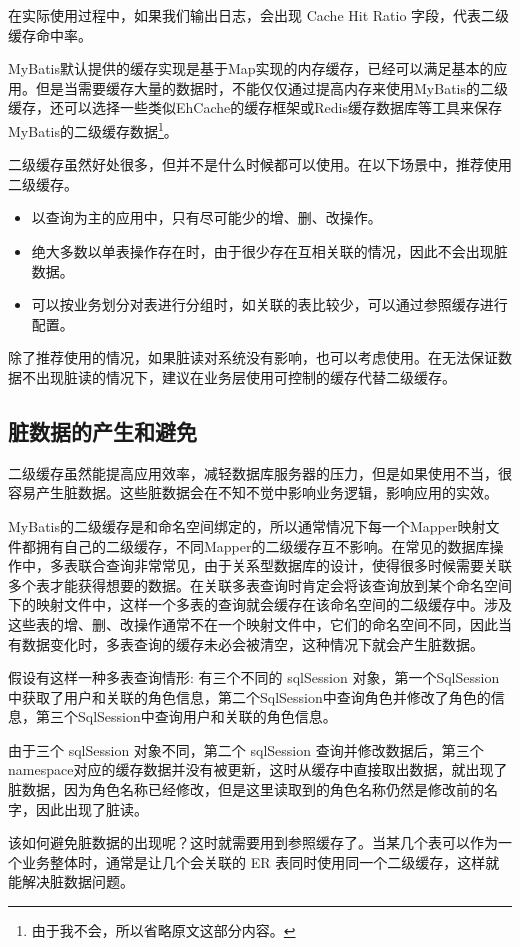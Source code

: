 在实际使用过程中，如果我们输出日志，会出现 Cache Hit Ratio 字段，代表二级缓存命中率。

MyBatis默认提供的缓存实现是基于Map实现的内存缓存，已经可以满足基本的应用。但是当需要缓存大量的数据时，不能仅仅通过提高内存来使用MyBatis的二级缓存，还可以选择一些类似EhCache的缓存框架或Redis缓存数据库等工具来保存MyBatis的二级缓存数据\footnote{由于我不会，所以省略原文这部分内容。}。

二级缓存虽然好处很多，但并不是什么时候都可以使用。在以下场景中，推荐使用二级缓存。

\begin{itemize}
    \item 以查询为主的应用中，只有尽可能少的增、删、改操作。
    \item 绝大多数以单表操作存在时，由于很少存在互相关联的情况，因此不会出现脏数据。
    \item 可以按业务划分对表进行分组时，如关联的表比较少，可以通过参照缓存进行配置。
\end{itemize}

除了推荐使用的情况，如果脏读对系统没有影响，也可以考虑使用。在无法保证数据不出现脏读的情况下，建议在业务层使用可控制的缓存代替二级缓存。

\subsection{脏数据的产生和避免}

二级缓存虽然能提高应用效率，减轻数据库服务器的压力，但是如果使用不当，很容易产生脏数据。这些脏数据会在不知不觉中影响业务逻辑，影响应用的实效。

MyBatis的二级缓存是和命名空间绑定的，所以通常情况下每一个Mapper映射文件都拥有自己的二级缓存，不同Mapper的二级缓存互不影响。在常见的数据库操作中，多表联合查询非常常见，由于关系型数据库的设计，使得很多时候需要关联多个表才能获得想要的数据。在关联多表查询时肯定会将该查询放到某个命名空间下的映射文件中，这样一个多表的查询就会缓存在该命名空间的二级缓存中。涉及这些表的增、删、改操作通常不在一个映射文件中，它们的命名空间不同，因此当有数据变化时，多表查询的缓存未必会被清空，这种情况下就会产生脏数据。

假设有这样一种多表查询情形: 有三个不同的 sqlSession 对象，第一个SqlSession中获取了用户和关联的角色信息，第二个SqlSession中查询角色并修改了角色的信息，第三个SqlSession中查询用户和关联的角色信息。

由于三个 sqlSession 对象不同，第二个 sqlSession 查询并修改数据后，第三个namespace对应的缓存数据并没有被更新，这时从缓存中直接取出数据，就出现了脏数据，因为角色名称已经修改，但是这里读取到的角色名称仍然是修改前的名字，因此出现了脏读。

该如何避免脏数据的出现呢？这时就需要用到参照缓存了。当某几个表可以作为一个业务整体时，通常是让几个会关联的 ER 表同时使用同一个二级缓存，这样就能解决脏数据问题。

\newpage